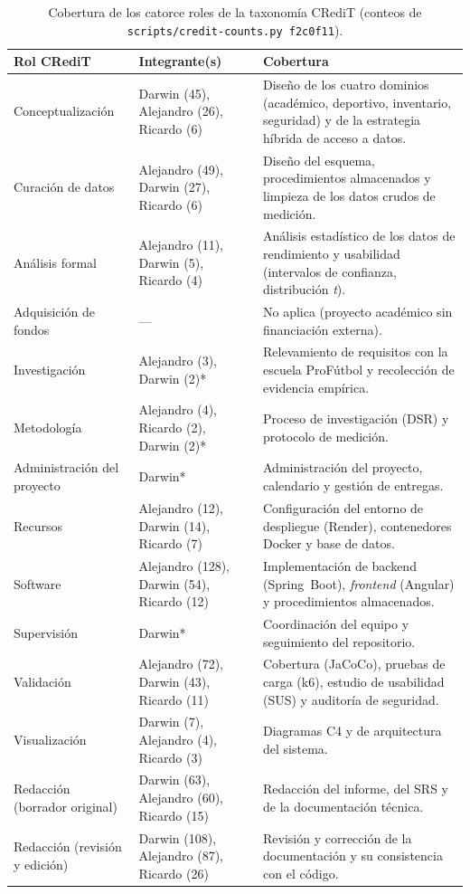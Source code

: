 \documentclass[11pt,a4paper]{article}
\begin{document}
\begin{table}[htbp]
\centering
\scriptsize
\caption{Cobertura de los catorce roles de la taxonomía CRediT (conteos de \texttt{scripts/credit-counts.py f2c0f11}).}
\label{tab:credit-cobertura}
\begin{tabular}{@{}p{3.2cm}p{3.4cm}p{7.2cm}@{}}
\toprule
\textbf{Rol CRediT} & \textbf{Integrante(s)} & \textbf{Cobertura} \\
\midrule
Conceptualización & Darwin (45), Alejandro (26), Ricardo (6) & Diseño de los cuatro dominios (académico, deportivo, inventario, seguridad) y de la estrategia híbrida de acceso a datos. \\
Curación de datos & Alejandro (49), Darwin (27), Ricardo (6) & Diseño del esquema, procedimientos almacenados y limpieza de los datos crudos de medición. \\
Análisis formal & Alejandro (11), Darwin (5), Ricardo (4) & Análisis estadístico de los datos de rendimiento y usabilidad (intervalos de confianza, distribución \emph{t}). \\
Adquisición de fondos & --- & No aplica (proyecto académico sin financiación externa). \\
Investigación & Alejandro (3), Darwin (2)* & Relevamiento de requisitos con la escuela ProFútbol y recolección de evidencia empírica. \\
Metodología & Alejandro (4), Ricardo (2), Darwin (2)* & Proceso de investigación (DSR) y protocolo de medición. \\
Administración del proyecto & Darwin* & Administración del proyecto, calendario y gestión de entregas. \\
Recursos & Alejandro (12), Darwin (14), Ricardo (7) & Configuración del entorno de despliegue (Render), contenedores Docker y base de datos. \\
Software & Alejandro (128), Darwin (54), Ricardo (12) & Implementación de backend (Spring~Boot), \emph{frontend} (Angular) y procedimientos almacenados. \\
Supervisión & Darwin* & Coordinación del equipo y seguimiento del repositorio. \\
Validación & Alejandro (72), Darwin (43), Ricardo (11) & Cobertura (JaCoCo), pruebas de carga (k6), estudio de usabilidad (SUS) y auditoría de seguridad. \\
Visualización & Darwin (7), Alejandro (4), Ricardo (3) & Diagramas C4 y de arquitectura del sistema. \\
Redacción (borrador original) & Darwin (63), Alejandro (60), Ricardo (15) & Redacción del informe, del SRS y de la documentación técnica. \\
Redacción (revisión y edición) & Darwin (108), Alejandro (87), Ricardo (26) & Revisión y corrección de la documentación y su consistencia con el código. \\
\bottomrule
\end{tabular}
\end{table}
\end{document}
